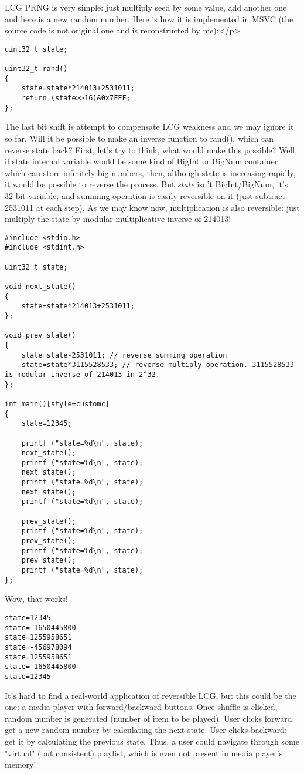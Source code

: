 
\ac{LCG} \ac{PRNG} is very simple: just multiply seed by some value, add another one and here is a new random number.
Here is how it is implemented in MSVC (the source code is not original one and is reconstructed by me):</p>

\begin{lstlisting}[style=customc]
uint32_t state;

uint32_t rand()
{
	state=state*214013+2531011;
	return (state>>16)&0x7FFF;
};
\end{lstlisting}

The last bit shift is attempt to compensate LCG weakness and we may ignore it so far.
Will it be possible to make an inverse function to rand(), which can reverse state back?
First, let's try to think, what would make this possible? Well, if state internal variable would be some kind of BigInt or BigNum container which can
store infinitely big numbers, then, although state is increasing rapidly, it would be possible to reverse the process.
But \textit{state} isn't BigInt/BigNum, it's 32-bit variable, and summing operation is easily reversible on it (just subtract 2531011 at each step).
As we may know now, multiplication is also reversible: just multiply the state by modular multiplicative inverse of 214013!

\begin{lstlisting}[style=customc]
#include <stdio.h>
#include <stdint.h>

uint32_t state;

void next_state()
{
	state=state*214013+2531011;
};

void prev_state()
{
	state=state-2531011; // reverse summing operation
	state=state*3115528533; // reverse multiply operation. 3115528533 is modular inverse of 214013 in 2^32.
};

int main()[style=customc]
{
	state=12345;
	
	printf ("state=%d\n", state);
	next_state();
	printf ("state=%d\n", state);
	next_state();
	printf ("state=%d\n", state);
	next_state();
	printf ("state=%d\n", state);

	prev_state();
	printf ("state=%d\n", state);
	prev_state();
	printf ("state=%d\n", state);
	prev_state();
	printf ("state=%d\n", state);
};
\end{lstlisting}

Wow, that works!

\begin{lstlisting}
state=12345
state=-1650445800
state=1255958651
state=-456978094
state=1255958651
state=-1650445800
state=12345
\end{lstlisting}

It's hard to find a real-world application of reversible LCG, but this could be the one:
a media player with forward/backward buttons.
Once shuffle is clicked, random number is generated (number of item to be played).
User clicks forward: get a new random number by calculating the next state.
User clicks backward: get it by calculating the previous state.
Thus, a user could navigate through some "virtual" (but consistent) playlist, which is even not present in media player's memory!

